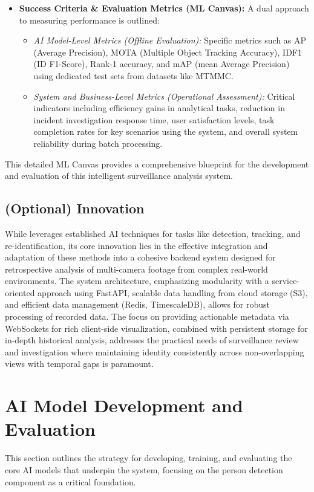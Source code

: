 \begin{itemize}
    \item \textbf{Success Criteria \& Evaluation Metrics (ML Canvas):}
        A dual approach to measuring performance is outlined:
        \begin{itemize}
            \item \textit{AI Model-Level Metrics (Offline Evaluation):} Specific metrics such as AP (Average Precision), MOTA (Multiple Object Tracking Accuracy), IDF1 (ID F1-Score), Rank-1 accuracy, and mAP (mean Average Precision) using dedicated test sets from datasets like MTMMC.
            \item \textit{System and Business-Level Metrics (Operational Assessment):} Critical indicators including efficiency gains in analytical tasks, reduction in incident investigation response time, user satisfaction levels, task completion rates for key scenarios using the system, and overall system reliability during batch processing.
        \end{itemize}
\end{itemize}
This detailed ML Canvas provides a comprehensive blueprint for the development and evaluation of this intelligent surveillance analysis system.

\subsection{(Optional) Innovation}
\label{subsection:innovation_aic}
While \usevar{\srsTitle} leverages established AI techniques for tasks like detection, tracking, and re-identification, its core innovation lies in the effective integration and adaptation of these methods into a cohesive backend system designed for retrospective analysis of multi-camera footage from complex real-world environments. The system architecture, emphasizing modularity with a service-oriented approach using FastAPI, scalable data handling from cloud storage (S3), and efficient data management (Redis, TimescaleDB), allows for robust processing of recorded data. The focus on providing actionable metadata via WebSockets for rich client-side visualization, combined with persistent storage for in-depth historical analysis, addresses the practical needs of surveillance review and investigation where maintaining identity consistently across non-overlapping views with temporal gaps is paramount.

\section{AI Model Development and Evaluation}
\label{section:ai_model_dev_eval_new}
This section outlines the strategy for developing, training, and evaluating the core AI models that underpin the \usevar{\srsTitle} system, focusing on the person detection component as a critical foundation.

